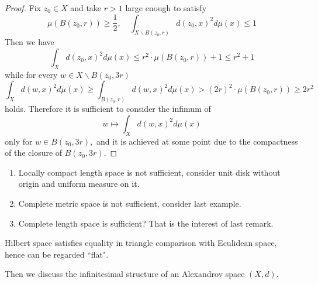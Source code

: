 \begin{proof}
	Fix \( z _ { 0 } \in X \) and take \( r > 1 \) large enough to satisfy
	\[ \mu \left( B \left( z _ { 0 } , r \right) \right) \geq \frac { 1 } { 2 } , \quad \int _ { X \backslash B \left( z _ { 0 } , r \right) } d \left( z _ { 0 } , x \right) ^ { 2 } d \mu ( x ) \leq 1 \]
	Then we have
	\[ \int _ { X } d \left( z _ { 0 } , x \right) ^ { 2 } d \mu ( x ) \leq r ^ { 2 } \cdot \mu \left( B \left( z _ { 0 } , r \right) \right) + 1 \leq r ^ { 2 } + 1 \]
	while for every \( w \in X \backslash B \left( z _ { 0 } , 3 r \right) \)
	\[ \int _ { X } d ( w , x ) ^ { 2 } d \mu ( x ) \geq \int _ { B \left( z _ { 0 } , r \right) } d ( w , x ) ^ { 2 } d \mu ( x ) > ( 2 r ) ^ { 2 } \cdot \mu \left( B \left( z _ { 0 } , r \right) \right) \geq 2 r ^ { 2 } \]
	holds. Therefore it is sufficient to consider the infimum of
	\[ w \longmapsto \int _ { X } d ( w , x ) ^ { 2 } d \mu ( x ) \]
	only for \( w \in B \left( z _ { 0 } , 3 r \right) , \) and it is achieved at some point due to the compactness of the closure of \( B \left( z _ { 0 } , 3 r \right) . \)
\end{proof}

\begin{rmk}
	\begin{enumerate}
		\item Locally compact length space is not sufficient, consider unit disk without origin and uniform measure on it.
		\item Complete metric space is not sufficient, consider last example.
		\item Complete length space is sufficient? That is the interest of last remark.
	\end{enumerate}
\end{rmk}
\begin{rmk}[Exmaple 2.1 c]
	Hilbert space satisfies equality in triangle comparison with Eculidean space, hence can be regarded ``flat".
\end{rmk}

Then we discuss the infinitesimal structure of an Alexandrov space \( ( X , d ) . \)

